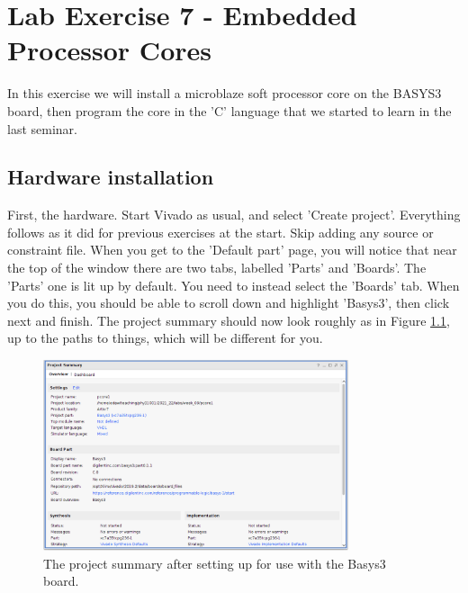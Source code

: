 \documentclass[../physical_computing.tex]{subfiles}
\begin{document}
\newcommand{\crlf}{\symbol{92}n\symbol{92}r}
\newcommand{\linefeed}{\symbol{92}n}

\chapter{Lab Exercise 7 - Embedded Processor Cores}
\label{sec:appendix_7}

In this exercise we will install a microblaze soft processor core on the BASYS3 board, then program the core in the 'C' language that we
started to learn in the last seminar. 

\section{Hardware installation}
\label{sec:hardware}

First, the hardware. Start Vivado as usual, and select 'Create project'. Everything follows as it did
for previous exercises at the start. Skip adding any source or constraint file. When you get to the 'Default part' page, you will notice that
near the top of the window there are two tabs, labelled 'Parts' and 'Boards'. The 'Parts' one is lit up by default. You need to instead select
the 'Boards' tab. When you do this, you should be able to scroll down and highlight 'Basys3', then click next and finish. The project summary
should now look roughly as in Figure \ref{fig:project1_summary}, up to the paths to things, which will be different for you.

\begin{figure}[h!]
    \centering
    \includegraphics[width=0.8\textwidth]{appendix_8/figures/project1_summary.png}
    \caption{The project summary after setting up for use with the Basys3 board.}
    \label{fig:project1_summary}
\end{figure}
\end{document}
